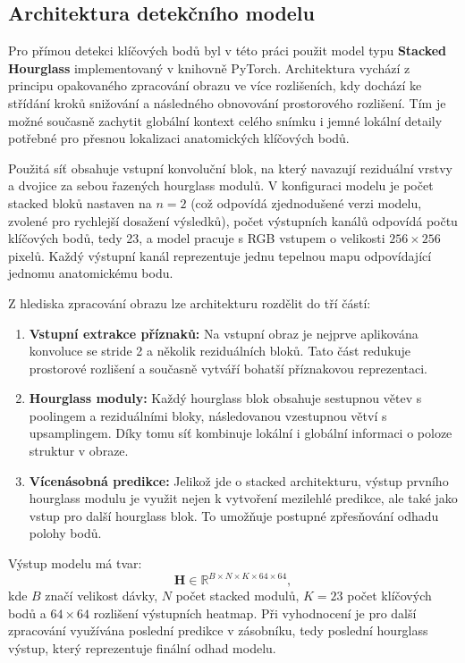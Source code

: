 \documentclass[male,czech,api_bc]{kitheses}
\begin{document}
\subsection{Architektura detekčního modelu}

Pro přímou detekci klíčových bodů byl v této práci použit model typu \textbf{Stacked Hourglass} implementovaný v knihovně PyTorch. Architektura vychází z principu opakovaného zpracování obrazu ve více rozlišeních, kdy dochází ke střídání kroků snižování a následného obnovování prostorového rozlišení. Tím je možné současně zachytit globální kontext celého snímku i jemné lokální detaily potřebné pro přesnou lokalizaci anatomických klíčových bodů.

Použitá síť obsahuje vstupní konvoluční blok, na který navazují reziduální vrstvy a dvojice za sebou řazených hourglass modulů. V konfiguraci modelu je počet stacked bloků nastaven na $n = 2$ (což odpovídá zjednodušené verzi modelu, zvolené pro rychlejší dosažení výsledků), počet výstupních kanálů odpovídá počtu klíčových bodů, tedy 23, a model pracuje s RGB vstupem o velikosti $256 \times 256$ pixelů. Každý výstupní kanál reprezentuje jednu tepelnou mapu odpovídající jednomu anatomickému bodu.

Z hlediska zpracování obrazu lze architekturu rozdělit do tří částí:
\begin{enumerate}
    \item \textbf{Vstupní extrakce příznaků:} Na vstupní obraz je nejprve aplikována konvoluce se stride 2 a několik reziduálních bloků. Tato část redukuje prostorové rozlišení a současně vytváří bohatší příznakovou reprezentaci.
    \item \textbf{Hourglass moduly:} Každý hourglass blok obsahuje sestupnou větev s poolingem a reziduálními bloky, následovanou vzestupnou větví s upsamplingem. Díky tomu síť kombinuje lokální i globální informaci o poloze struktur v obraze.
    \item \textbf{Vícenásobná predikce:} Jelikož jde o stacked architekturu, výstup prvního hourglass modulu je využit nejen k vytvoření mezilehlé predikce, ale také jako vstup pro další hourglass blok. To umožňuje postupné zpřesňování odhadu polohy bodů.
\end{enumerate}

Výstup modelu má tvar:
\[
\mathbf{H} \in \mathbb{R}^{B \times N \times K \times 64 \times 64},
\]
kde $B$ značí velikost dávky, $N$ počet stacked modulů, $K = 23$ počet klíčových bodů a $64 \times 64$ rozlišení výstupních heatmap. Při vyhodnocení je pro další zpracování využívána poslední predikce v zásobníku, tedy poslední hourglass výstup, který reprezentuje finální odhad modelu.
\end{document}
